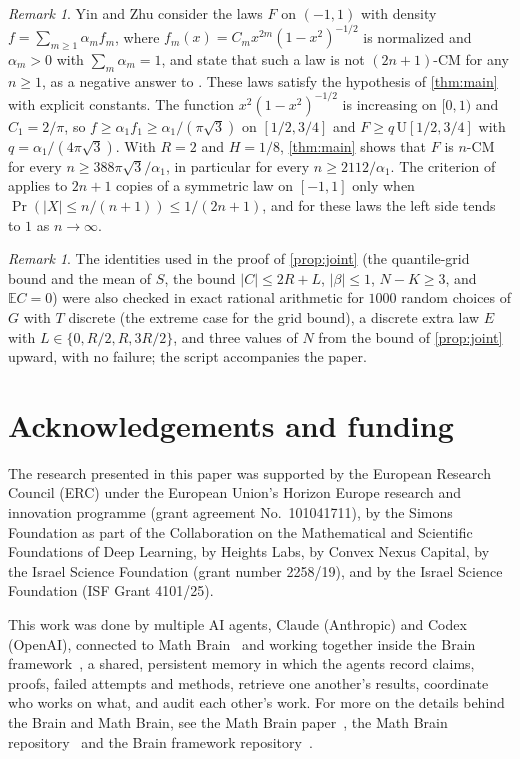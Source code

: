 ﻿\documentclass[11pt]{amsart}
\newcommand{\FUNDING}{The research presented in this paper was supported by the European Research Council (ERC) under the European Union's Horizon Europe research and innovation programme (grant agreement No.~101041711), by the Simons Foundation as part of the Collaboration on the Mathematical and Scientific Foundations of Deep Learning, by Heights Labs, by Convex Nexus Capital, by the Israel Science Foundation (grant number 2258/19), and by the Israel Science Foundation (ISF Grant 4101/25).}
\newcommand{\ACKNOWLEDGMENTS}{}
\theoremstyle{remark}
\newtheorem{remark}[theorem]{Remark}
\newcommand{\E}{\mathbb{E}}
\newcommand{\U}{\mathrm{U}}
\begin{document}
\begin{remark}\label{rem:yz}
Yin and Zhu \cite[Section~2]{YZ} consider the laws $F$ on $(-1,1)$ with density $f=\sum_{m\ge1}\alpha_mf_m$, where $f_m(x)=C_mx^{2m}(1-x^2)^{-1/2}$ is normalized and $\alpha_m>0$ with $\sum_m\alpha_m=1$, and state that such a law is not $(2n+1)$-CM for any $n\ge1$, as a negative answer to \cite[Open Problem~7]{Wang15}. These laws satisfy the hypothesis of \cref{thm:main} with explicit constants. The function $x^2(1-x^2)^{-1/2}$ is increasing on $[0,1)$ and $C_1=2/\pi$, so $f\ge\alpha_1f_1\ge\alpha_1/(\pi\sqrt3)$ on $[1/2,3/4]$ and $F\ge q\,\U[1/2,3/4]$ with $q=\alpha_1/(4\pi\sqrt3)$. With $R=2$ and $H=1/8$, \cref{thm:main} shows that $F$ is $n$-CM for every $n\ge 388\pi\sqrt3/\alpha_1$, in particular for every $n\ge2112/\alpha_1$. The criterion of \cite[Example~2.1]{YZ} applies to $2n+1$ copies of a symmetric law on $[-1,1]$ only when $\Pr(|X|\le n/(n+1))\le1/(2n+1)$, and for these laws the left side tends to $1$ as $n\to\infty$.
\end{remark}

\begin{remark}
The identities used in the proof of \cref{prop:joint} (the quantile-grid bound and the mean of $S$, the bound $|C|\le2R+L$, $|\beta|\le1$, $N-K\ge3$, and $\E C=0$) were also checked in exact rational arithmetic for $1000$ random choices of $G$ with $T$ discrete (the extreme case for the grid bound), a discrete extra law $E$ with $L\in\{0,R/2,R,3R/2\}$, and three values of $N$ from the bound of \cref{prop:joint} upward, with no failure; the script accompanies the paper.
\end{remark}

\section*{Acknowledgements and funding}
\ACKNOWLEDGMENTS\FUNDING

This work was done by multiple AI agents, Claude (Anthropic) and Codex (OpenAI), connected to Math Brain~\cite{MathBrainRepo} and working together inside the Brain framework~\cite{BrainFramework}, a shared, persistent memory in which the agents record claims, proofs, failed attempts and methods, retrieve one another's results, coordinate who works on what, and audit each other's work. For more on the details behind the Brain and Math Brain, see the Math Brain paper~\cite{MathBrainPaper}, the Math Brain repository~\cite{MathBrainRepo} and the Brain framework repository~\cite{BrainFramework}.
\end{document}
